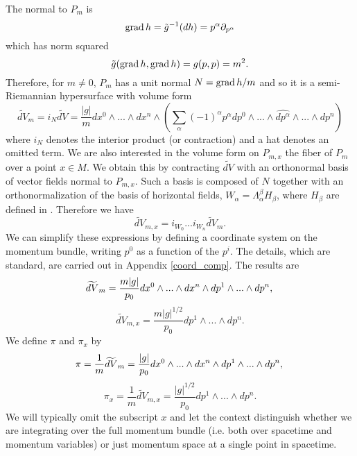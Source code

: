 The normal to $P_m$ is 
\begin{equation}
\operatorname{grad} h=\tilde{g}^{-1}(dh)=p^\alpha\partial_{p^\alpha}
\end{equation}
which has norm squared 
\begin{equation}
\tilde{g}(\operatorname{grad} h,\operatorname{grad} h)=g(p,p)=m^2.
\end{equation}
Therefore, for $m\neq 0$, $P_m$ has a unit normal $N=\operatorname{grad} h/m$ and so it is a semi-Riemannian hypersurface with volume form
\begin{equation}
\widetilde{dV}_m=i_N \widetilde{dV}=\frac{|g|}{m}dx^0\wedge...\wedge dx^n\wedge\left(\sum_\alpha (-1)^\alpha p^\alpha dp^0\wedge...\wedge\widehat{dp^\alpha}\wedge...\wedge dp^n\right)
\end{equation}
where $i_N$ denotes the interior product (or contraction) and a hat denotes an omitted term.  We are also interested in the volume form on $P_{m,x}$ the fiber of $P_m$ over a point $x\in M$.  We obtain this by contracting $\widetilde{dV}$ with an orthonormal basis of vector fields normal to $P_{m,x}$. Such a basis is composed of $N$ together with an orthonormalization of the basis of horizontal fields, $W_\alpha=\Lambda^\beta_\alpha H_\beta$, where $H_\beta$ are defined in . Therefore we have
\begin{equation}\label{contract_horiz}
\widetilde{dV}_{m,x}=i_{W_0}...i_{W_n}\widetilde{dV}_m.
\end{equation}
 We can simplify these expressions by defining a coordinate system on the momentum bundle, writing $p^0$ as a function of the $p^i$.  The details, which are standard, are carried  out in Appendix  \ref{coord_comp}.  The results are
\begin{equation}
\widetilde{dV}_m=\frac{m|g|}{p_0}dx^0\wedge...\wedge dx^n\wedge dp^1\wedge...\wedge dp^n,\\
\end{equation}
\begin{equation}
\widetilde{dV}_{m,x}=\frac{m|g|^{1/2}}{p_0}dp^1\wedge...\wedge dp^n.
\end{equation}
We define $\pi$ and $\pi_x$ by
\begin{equation}
\pi=\frac{1}{m}\widetilde{dV}_m=\frac{|g|}{p_0}dx^0\wedge...\wedge dx^n\wedge dp^1\wedge...\wedge dp^n,\\
\end{equation}
\begin{equation}\label{pi_x}
\pi_x=\frac{1}{m}\widetilde{dV}_{m,x}=\frac{|g|^{1/2}}{p_0}dp^1\wedge...\wedge dp^n.
\end{equation}
We will typically omit the subscript $x$ and let the context distinguish whether we are integrating over the full momentum bundle (i.e. both over spacetime and momentum variables) or just momentum space at a single point in spacetime.  \\

